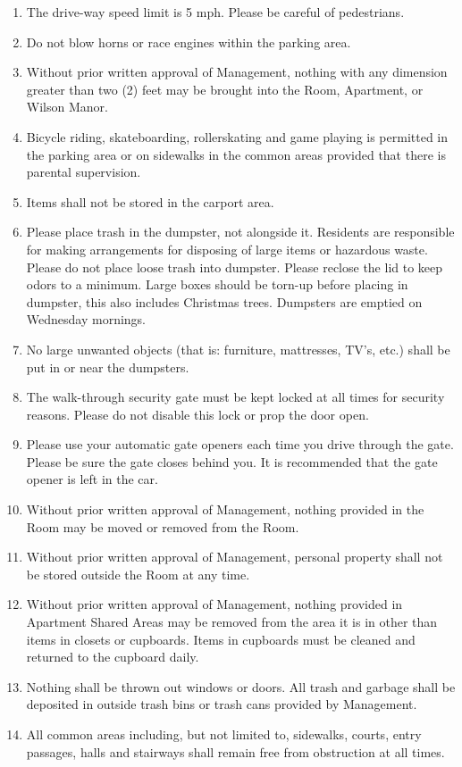 \documentclass[12pt,letterpaper]{article}
\newcommand{\management}{Management}
\newcommand{\condo}{Wilson Manor}
\newcommand{\apt}{Apartment}
\newcommand{\room}{Room}
\newcommand{\shared}{Apartment Shared Areas}
\begin{document}
\begin{enumerate}
		\item The drive-way speed limit is 5 mph. Please be careful of pedestrians.
		\item Do not blow horns or race engines within the parking area. 
		\item Without prior written approval of \management{}, nothing with any dimension greater than two (2) feet may be brought into the \room{}, \apt{}, or \condo{}.
		\item Bicycle riding, skateboarding, rollerskating and game playing is permitted in the parking area or on sidewalks in the common areas provided that there is parental supervision.
		\item Items shall not be stored in the carport area.
		\item Please place trash in the dumpster, not alongside it. Residents are responsible for making arrangements for disposing of large items or hazardous waste. Please do not place loose trash into dumpster. Please reclose the lid to keep odors to a minimum. Large boxes should be torn-up before placing in dumpster, this also includes Christmas trees. Dumpsters are emptied on Wednesday mornings. 
		\item No large unwanted objects (that is: furniture, mattresses, TV's, etc.) shall be put in or near the dumpsters.
		\item The walk-through security gate must be kept locked at all times for security reasons. Please do not disable this lock or prop the door open. 
		\item Please use your automatic gate openers each time you drive through the gate. Please be sure the gate closes behind you. It is recommended that the gate opener is left in the car.
		\item Without prior written approval of \management{}, nothing provided in the \room{} may be moved or removed from the \room{}.
		\item Without prior written approval of \management{}, personal property shall not be stored outside the \room{} at any time. 
		\item Without prior written approval of \management{}, nothing provided in \shared{} may be removed from the area it is in other than items in closets or cupboards. Items in cupboards must be cleaned and returned to the cupboard daily.
		\item Nothing shall be thrown out windows or doors. All trash and garbage shall be deposited in outside trash bins or trash cans provided by \management{}. 
		\item All common areas including, but not limited to, sidewalks, courts, entry passages, halls and stairways shall remain free from obstruction at all times. 

\end{enumerate}
\end{document}
